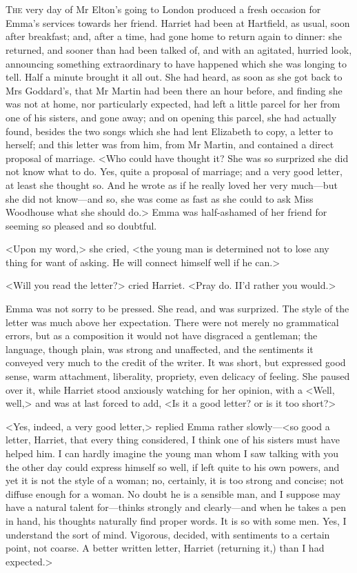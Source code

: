 \chapter[Chapter \thechapter]{}
\lettrine[lraise=0.3]{T}{he} very day of Mr Elton's going to London produced a fresh occasion for Emma's services towards her friend. Harriet had been at Hartfield, as usual, soon after breakfast; and, after a time, had gone home to return again to dinner: she returned, and sooner than had been talked of, and with an agitated, hurried look, announcing something extraordinary to have happened which she was longing to tell. Half a minute brought it all out. She had heard, as soon as she got back to Mrs Goddard's, that Mr Martin had been there an hour before, and finding she was not at home, nor particularly expected, had left a little parcel for her from one of his sisters, and gone away; and on opening this parcel, she had actually found, besides the two songs which she had lent Elizabeth to copy, a letter to herself; and this letter was from him, from Mr Martin, and contained a direct proposal of marriage. <Who could have thought it? She was so surprized she did not know what to do. Yes, quite a proposal of marriage; and a very good letter, at least she thought so. And he wrote as if he really loved her very much—but she did not know—and so, she was come as fast as she could to ask Miss Woodhouse what she should do.\longdash> Emma was half-ashamed of her friend for seeming so pleased and so doubtful.

<Upon my word,> she cried, <the young man is determined not to lose any thing for want of asking. He will connect himself well if he can.>

<Will you read the letter?> cried Harriet. <Pray do. II'd rather you would.>

Emma was not sorry to be pressed. She read, and was surprized. The style of the letter was much above her expectation. There were not merely no grammatical errors, but as a composition it would not have disgraced a gentleman; the language, though plain, was strong and unaffected, and the sentiments it conveyed very much to the credit of the writer. It was short, but expressed good sense, warm attachment, liberality, propriety, even delicacy of feeling. She paused over it, while Harriet stood anxiously watching for her opinion, with a <Well, well,> and was at last forced to add, <Is it a good letter? or is it too short?>

<Yes, indeed, a very good letter,> replied Emma rather slowly—<so good a letter, Harriet, that every thing considered, I think one of his sisters must have helped him. I can hardly imagine the young man whom I saw talking with you the other day could express himself so well, if left quite to his own powers, and yet it is not the style of a woman; no, certainly, it is too strong and concise; not diffuse enough for a woman. No doubt he is a sensible man, and I suppose may have a natural talent for—thinks strongly and clearly—and when he takes a pen in hand, his thoughts naturally find proper words. It is so with some men. Yes, I understand the sort of mind. Vigorous, decided, with sentiments to a certain point, not coarse. A better written letter, Harriet (returning it,) than I had expected.>

